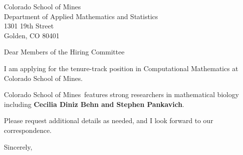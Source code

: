 




	
	
	\def\School{Colorado School of Mines}
	
	\begin{letter}
		{Colorado School of Mines\\
			Department of Applied Mathematics and Statistics\\
			1301 19th Street\\
			Golden, CO 80401
		}
		
		\opening{Dear Members of the Hiring Committee}
		
		
		I am applying for the tenure-track position in Computational Mathematics at \School. 
		
		\School~features strong researchers in mathematical biology including \textbf{Cecilia Diniz Behn and Stephen Pankavich}. 
		
		
		
		
		
		Please request additional details as needed, and I look forward to our correspondence.
		
		\closing{Sincerely,}
	\end{letter}
